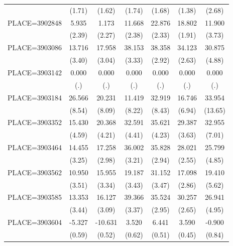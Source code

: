{\begin{tabular}{l*{6}{c}}
                    &      (1.71)&      (1.62)&      (1.74)&      (1.68)&      (1.38)&      (2.68)\\
PLACE=3902848       &       5.935&       1.173&      11.668&      22.876&      18.802&      11.900\\
                    &      (2.39)&      (2.27)&      (2.38)&      (2.33)&      (1.91)&      (3.73)\\
PLACE=3903086       &      13.716&      17.958&      38.153&      38.358&      34.123&      30.875\\
                    &      (3.40)&      (3.04)&      (3.33)&      (2.92)&      (2.63)&      (4.88)\\
PLACE=3903142       &       0.000&       0.000&       0.000&       0.000&       0.000&       0.000\\
                    &         (.)&         (.)&         (.)&         (.)&         (.)&         (.)\\
PLACE=3903184       &      26.566&      20.231&      11.419&      32.919&      16.746&      33.954\\
                    &      (8.54)&      (8.09)&      (8.22)&      (8.43)&      (6.94)&     (13.65)\\
PLACE=3903352       &      15.430&      20.368&      32.591&      35.621&      29.387&      32.955\\
                    &      (4.59)&      (4.21)&      (4.41)&      (4.23)&      (3.63)&      (7.01)\\
PLACE=3903464       &      14.455&      17.258&      36.002&      35.828&      28.021&      25.799\\
                    &      (3.25)&      (2.98)&      (3.21)&      (2.94)&      (2.55)&      (4.85)\\
PLACE=3903562       &      10.950&      15.955&      19.187&      31.152&      17.098&      19.410\\
                    &      (3.51)&      (3.34)&      (3.43)&      (3.47)&      (2.86)&      (5.62)\\
PLACE=3903585       &      13.353&      16.127&      39.366&      35.524&      30.257&      26.941\\
                    &      (3.44)&      (3.09)&      (3.37)&      (2.95)&      (2.65)&      (4.95)\\
PLACE=3903604       &      -5.327&     -10.631&       3.520&       6.441&       3.590&      -0.900\\
                    &      (0.59)&      (0.52)&      (0.62)&      (0.51)&      (0.45)&      (0.84)\\

\end{tabular}}
